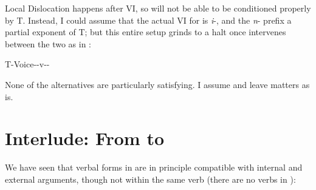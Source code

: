 \begin{exe}
\begin{xlist}
\begin{xlist}
\begin{exe}
\begin{xlist}
\begin{xlist}
\begin{exe}
\begin{xlist}
\begin{xlist}
\begin{exe}
\begin{exe}
\begin{xlist}
\begin{exe}
\begin{exe}
\begin{xlist}
\begin{exe}
\begin{exe}
\begin{exe}
\begin{exe}
\begin{exe}
\begin{xlist}
\begin{exe}
\begin{xlist}
\begin{exe}
\begin{exe}
\begin{xlist}
\begin{exe}
\begin{xlist}
\begin{exe}
\begin{exe}
\begin{exe}
\begin{xlist}
\begin{exe}
\begin{exe}
\begin{exe}
\begin{xlist}
\begin{exe}
\begin{xlist}
\begin{exe}
\begin{xlist}
\begin{exe}
\begin{xlist}
\begin{exe}
\begin{exe}
\begin{exe}
\begin{exe}
\begin{xlist}
\begin{exe}
\begin{xlist}
\begin{exe}
\begin{xlist}
\begin{exe}
\begin{xlist}
\begin{exe}
\begin{xlist}
\begin{exe}
\begin{xlist}
\begin{exe}
\begin{exe}
\begin{exe}
\begin{exe}
\begin{xlist}
\begin{exe}
\begin{xlist}
\begin{exe}
\begin{xlist}
Local Dislocation happens after VI, so {\pz} will not be able to be conditioned properly by T. Instead, I could assume that the actual VI for {\pz} is \emph{i}-, and the \emph{n}- prefix a partial exponent of T; but this entire setup grinds to a halt once {\va} intervenes between the two as in {\thit}:
 \begin{exe}
\ex  T-Voice-{\va}-v-\pz- 
 \z 

None of the alternatives are particularly satisfying. I assume  and leave matters as is.


\section{Interlude: From {\tnif} to {\thit}} \label{vz:interim}
We have seen that verbal forms in {\tnif} are in principle compatible with internal and external arguments, though not within the same verb (there are no  verbs in {\tnif}):

\end{exe}
\end{xlist}
\end{exe}
\end{xlist}
\end{exe}
\end{xlist}
\end{exe}
\end{exe}
\end{exe}
\end{exe}
\end{xlist}
\end{exe}
\end{xlist}
\end{exe}
\end{xlist}
\end{exe}
\end{xlist}
\end{exe}
\end{xlist}
\end{exe}
\end{xlist}
\end{exe}
\end{exe}
\end{exe}
\end{exe}
\end{xlist}
\end{exe}
\end{xlist}
\end{exe}
\end{xlist}
\end{exe}
\end{xlist}
\end{exe}
\end{exe}
\end{exe}
\end{xlist}
\end{exe}
\end{exe}
\end{exe}
\end{xlist}
\end{exe}
\end{xlist}
\end{exe}
\end{exe}
\end{xlist}
\end{exe}
\end{xlist}
\end{exe}
\end{exe}
\end{exe}
\end{exe}
\end{exe}
\end{xlist}
\end{exe}
\end{exe}
\end{xlist}
\end{exe}
\end{exe}
\end{xlist}
\end{xlist}
\end{exe}
\end{xlist}
\end{xlist}
\end{exe}
\end{xlist}
\end{xlist}
\end{exe}
